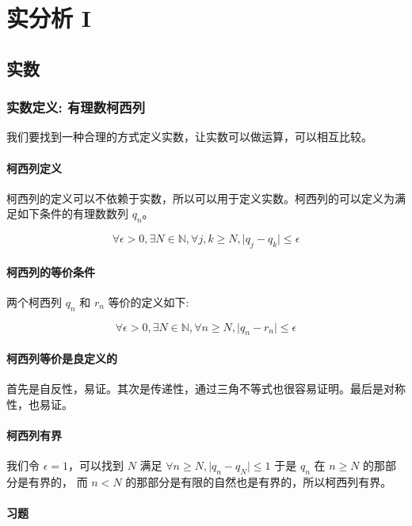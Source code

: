 \part{实分析 I}
\chapter{实数}

\section{实数定义: 有理数柯西列}

我们要找到一种合理的方式定义实数，让实数可以做运算，可以相互比较。

\subsection{柯西列定义}

柯西列的定义可以不依赖于实数，所以可以用于定义实数。柯西列的可以定义为满足如下条件的有理数数列 $ q_n $。

\[ \forall \epsilon > 0, \exists N \in \mathbb{N}, 
    \forall j, k \ge N, \lvert q_j - q_k \rvert \le \epsilon \] 

\subsection{柯西列的等价条件}

两个柯西列 $q_n$ 和 $r_n$ 等价的定义如下:

\[ 
    \forall \epsilon > 0, \exists N \in \mathbb{N},
    \forall n \ge N, \lvert q_n - r_n \rvert \le \epsilon 
\]

\subsection{柯西列等价是良定义的}

首先是自反性，易证。其次是传递性，通过三角不等式也很容易证明。最后是对称性，也易证。

\subsection{柯西列有界}

我们令 $\epsilon = 1 $，可以找到 $N$ 满足 $\forall n \ge N , \lvert q_n - q_N \rvert \le 1 $ 于是 $q_n$ 在 $n \ge N$ 的那部分是有界的，
而 $n < N$ 的那部分是有限的自然也是有界的，所以柯西列有界。

\subsection{习题}


